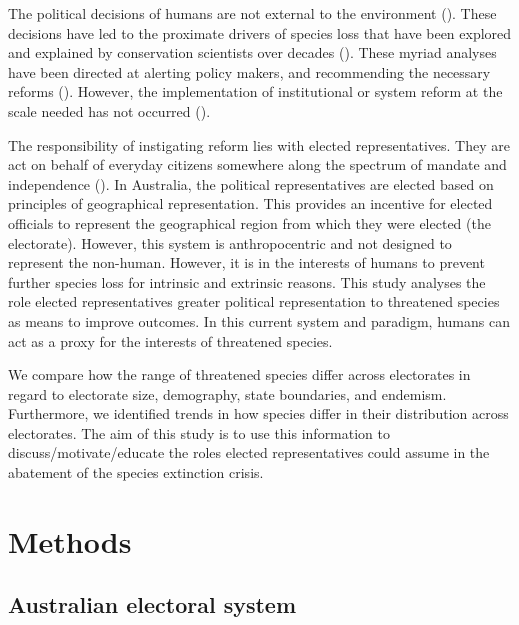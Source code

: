\documentclass[a4paper,11pt]{article}
\begin{document}
The political decisions of humans are not external to the environment (\cite{rydenLinkingDemocracyBiodiversity2020, dalbyAnthropoceneFormationsEnvironmental2017a,burkeSpeciesBordersPolitical2020}). These decisions have led to the proximate drivers of species loss that have been explored and explained by conservation scientists over decades (\cite{kearneyThreatsAustraliaImperilled2019,allekThreatsEndangeringAustralia2018}). These myriad analyses have been directed at alerting policy makers, and recommending the necessary reforms (\cite{hawkeReportIndependentReview2009,samuelIndependentReviewEPBC2020,mcdonaldImprovingPolicyEfficiency2015}). However, the implementation of institutional or system reform at the scale needed has not occurred (\cite{woinarskiContributionPolicyLaw2017,resideHowSendFinch2019}).

The responsibility of instigating reform lies with elected representatives. They are act on behalf of everyday citizens somewhere along the spectrum of mandate and independence (\cite{pitkinConceptRepresentation1972}). In Australia, the political representatives are elected based on principles of geographical representation. This provides an incentive for elected officials to represent the geographical region from which they were elected (the electorate). However, this system is anthropocentric and not designed to represent the non-human. However, it is in the interests of humans to prevent further species loss for intrinsic and extrinsic reasons. This study analyses the role elected representatives greater political representation to threatened species as means to improve outcomes. In this current system and paradigm, humans can act as a proxy for the interests of threatened species.

We compare how the range of threatened species differ across electorates in regard to electorate size, demography, state boundaries, and endemism. Furthermore, we identified trends in how species differ in their distribution across electorates. The aim of this study is to use this information to discuss/motivate/educate the roles elected representatives could assume in the abatement of the species extinction crisis.

\section{Methods}

\subsection{Australian electoral system}
\end{document}
